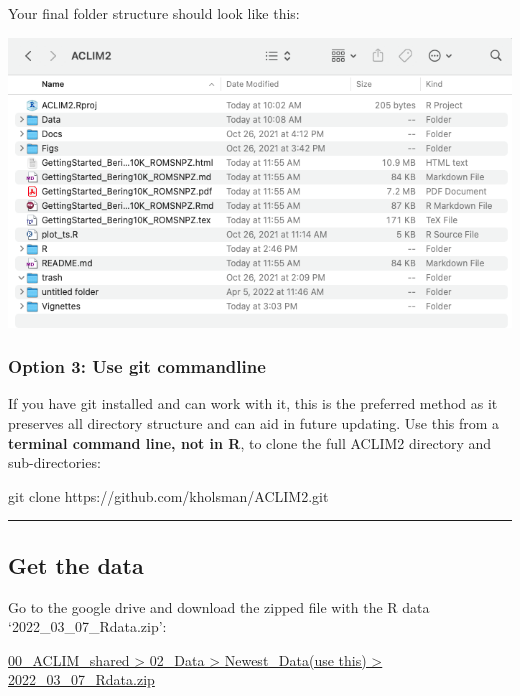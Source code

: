 \documentclass[
]{article}
\newenvironment{Shaded}{\begin{snugshade}}{\end{snugshade}}
\newcommand{\FunctionTok}[1]{\textcolor[rgb]{0.00,0.00,0.00}{#1}}
\newcommand{\NormalTok}[1]{#1}
\begin{document}
Your final folder structure should look like this:

\includegraphics[width=1\textwidth,height=\textheight]{Figs/ACLIM_dir.png}

\hypertarget{option-3-use-git-commandline}{%
\subsubsection{Option 3: Use git
commandline}\label{option-3-use-git-commandline}}

If you have git installed and can work with it, this is the preferred
method as it preserves all directory structure and can aid in future
updating. Use this from a \textbf{terminal command line, not in R}, to
clone the full ACLIM2 directory and sub-directories:

\begin{Shaded}
\begin{Highlighting}[]
    \FunctionTok{git}\NormalTok{ clone https://github.com/kholsman/ACLIM2.git}
\end{Highlighting}
\end{Shaded}

\begin{center}\rule{0.5\linewidth}{0.5pt}\end{center}

\hypertarget{get-the-data}{%
\subsection{Get the data}\label{get-the-data}}

Go to the google drive and download the zipped file with the R data
`2022\_03\_07\_Rdata.zip':

\href{https://drive.google.com/drive/folders/11BQEfNEl9vvrN-V0LgS67XS4aLE9pNzz}{00\_ACLIM\_shared
\textgreater{} 02\_Data \textgreater{} Newest\_Data(use this)
\textgreater{} 2022\_03\_07\_Rdata.zip}
\end{document}
